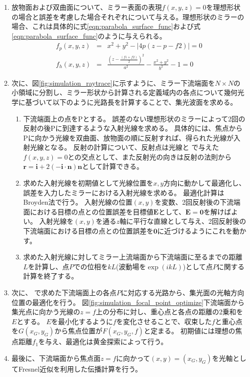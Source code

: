 \begin{enumerate}[\expandafter\maru 1]
  \item 放物面および双曲面について、ミラー表面の表現$f(x, y, z)=0$を理想形状の場合と誤差を考慮した場合それぞれについて与える。理想形状のミラーの場合、これは具体的に式\ref{eqn:parabola_surface_func}および式\ref{eqn:parabola_surface_func}のように与えられる。 \\
    \begin{eqnarray}
        f_p(x, y, z) &=& x^2 + y^2 - \left|4p(z-p-f2)\right| = 0 \label{eqn:parabola_surface_func} \\
        f_h(x, y, z) &=& \frac{\left(z - \frac{(f1 + f2)}{2}\right)^2}{a^2} - \frac{x^2 + y^2}{b^2} - 1 = 0 \label{eqn:hyperbola_surface_func}
    \end{eqnarray}
  \item 次に、図\ref{fig:simulation_raytrace}に示すように、ミラー下流端面を$N \times N$の小領域に分割し、ミラー形状から計算される定義域内の各点について幾何光学に基づいて以下のように光路長を計算することで、集光波面を求める。
    \begin{enumerate}[(1)]
      \item 下流端面上の点をPとする。
        誤差のない理想形状のミラーによって2回の反射の後Pに到達するような入射光線を求める。
        具体的には、焦点からPに向かう光線を双曲面、放物面の順に反射すれば、得られた光線が入射光線となる。
        反射の計算について、反射点は光線と\expandafter{} で与えた$f(x, y, z)=0$との交点として、また反射光の向きは反射の法則から$\mathbf{r} = \mathbf{i} + 2 (-\mathbf{i} \cdot \mathbf{n}) \mathbf{n}$として計算できる。
      \item 求めた入射光線を初期値として光線位置を$x, y$方向に動かして最適化し、誤差を入力したミラーにおける入射光線を求める。
        最適化計算はBroyden法で行う。
        入射光線の位置$(x, y)$を変数、2回反射後の下流端面における目標の点との位置誤差を目標値$\mathbf{E}$として、$\mathbf{E}=\mathbf{0}$を解けばよい。
        入射光線を$(x, y)$を通る$z$軸に平行な直線として与え、2回反射後の下流端面における目標の点との位置誤差を$\mathbf{0}$に近づけるようにこれを動かす。
      \item 求めた入射光線に対してミラー上流端面から下流端面に至るまでの距離$L$を計算し、点$P$での位相を$k L$(波動場を$\exp(i k L)$)として点$P$に関する計算を終了する。
    \end{enumerate}
  \item 次に、\expandafter{} で求めた下流端面上の各点$P$に対応する光路から、集光面の光軸方向位置の最適化を行う。
    図\ref{fig:simulation_focal_point_optimize}下流端面から集光点に向かう光線の$z=f$上の分布に対し、重心点と各点の距離の2乗和を$E$とする。
    $E$を最小化するように$f$を変化させることで、収束した$f$と重心点を$G(x_G, y_G)$から焦点位置が$F(x_G, y_G, f)$と定まる。
    初期値には理想の焦点距離$f_1$を与え、最適化は黄金探索によって行う。
  \item 最後に、下流端面から焦点面$z=f$に向かって$(x, y)=(x_G, y_G)$を光軸としてFresnel近似を利用した伝播計算を行う。
\end{enumerate}

